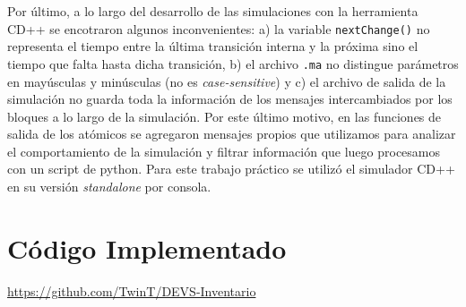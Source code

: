 \documentclass[10pt]{article}
\begin{document}
Por último, a lo largo del desarrollo de las simulaciones con la herramienta CD++ se encotraron algunos inconvenientes: a) la variable \texttt{nextChange()} no representa el tiempo entre la última transición interna y la próxima sino el tiempo que falta hasta dicha transición, b) el archivo \texttt{.ma} no distingue parámetros en mayúsculas y minúsculas (no es \textit{case-sensitive}) y c) el archivo de salida de la simulación no guarda toda la información de los mensajes intercambiados por los bloques a lo largo de la simulación. Por este último motivo, en las funciones de salida de los atómicos se agregaron mensajes propios que utilizamos para analizar el comportamiento de la simulación y filtrar información que luego procesamos con un script de python. Para este trabajo práctico se utilizó el simulador CD++ en su versión \textit{standalone} por consola.











\appendix
\section{Código Implementado}

\url{https://github.com/TwinT/DEVS-Inventario}



\end{document}
